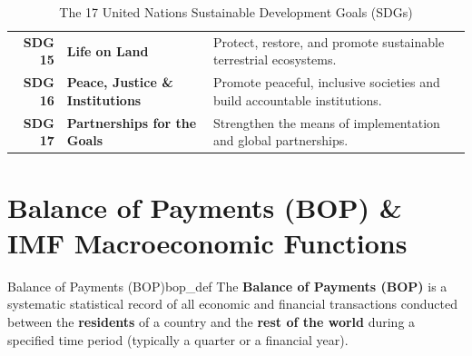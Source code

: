 \begin{table}[htbp]
\begin{tabularx}{\textwidth}{rlX}
        \textbf{SDG 15} & \textbf{Life on Land} & Protect, restore, and promote sustainable terrestrial ecosystems. \\
        \textbf{SDG 16} & \textbf{Peace, Justice \& Institutions} & Promote peaceful, inclusive societies and build accountable institutions. \\
        \textbf{SDG 17} & \textbf{Partnerships for the Goals} & Strengthen the means of implementation and global partnerships. \\
        \bottomrule
    \end{tabularx}
    \caption{The 17 United Nations Sustainable Development Goals (SDGs)}
    \label{tab:sdgs_summary}
\end{table}

\section{Balance of Payments (BOP) \& IMF Macroeconomic Functions}

\begin{definition}{Balance of Payments (BOP)}{bop_def}
The \textbf{Balance of Payments (BOP)} is a systematic statistical record of all economic and financial transactions conducted between the \textbf{residents} of a country and the \textbf{rest of the world} during a specified time period (typically a quarter or a financial year).
\end{definition}

